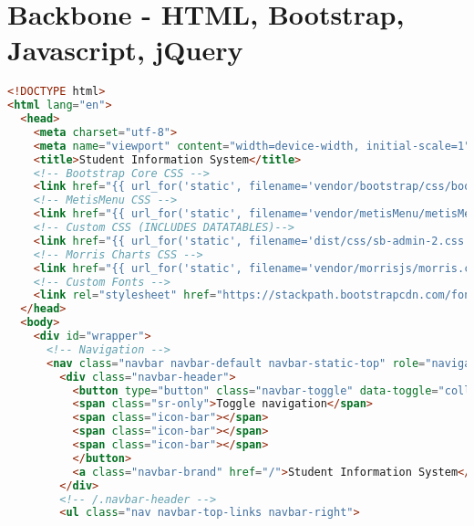 \pagebreak

\section{Backbone - HTML, Bootstrap, Javascript, jQuery}
\begin{lstlisting}[language=HTML]
<!DOCTYPE html>
<html lang="en">
  <head>
    <meta charset="utf-8">
    <meta name="viewport" content="width=device-width, initial-scale=1">
    <title>Student Information System</title>
    <!-- Bootstrap Core CSS -->
    <link href="{{ url_for('static', filename='vendor/bootstrap/css/bootstrap.min.css') }}" rel="stylesheet">
    <!-- MetisMenu CSS -->
    <link href="{{ url_for('static', filename='vendor/metisMenu/metisMenu.min.css') }}" rel="stylesheet">
    <!-- Custom CSS (INCLUDES DATATABLES)-->
    <link href="{{ url_for('static', filename='dist/css/sb-admin-2.css') }}" rel="stylesheet">
    <!-- Morris Charts CSS -->
    <link href="{{ url_for('static', filename='vendor/morrisjs/morris.css') }}" rel="stylesheet">
    <!-- Custom Fonts -->
    <link rel="stylesheet" href="https://stackpath.bootstrapcdn.com/font-awesome/4.7.0/css/font-awesome.min.css">
  </head>
  <body>
    <div id="wrapper">
      <!-- Navigation -->
      <nav class="navbar navbar-default navbar-static-top" role="navigation" style="margin-bottom: 0">
        <div class="navbar-header">
          <button type="button" class="navbar-toggle" data-toggle="collapse" data-target=".navbar-collapse">
          <span class="sr-only">Toggle navigation</span>
          <span class="icon-bar"></span>
          <span class="icon-bar"></span>
          <span class="icon-bar"></span>
          </button>
          <a class="navbar-brand" href="/">Student Information System</a>
        </div>
        <!-- /.navbar-header -->
        <ul class="nav navbar-top-links navbar-right">
          

\end{lstlisting}
